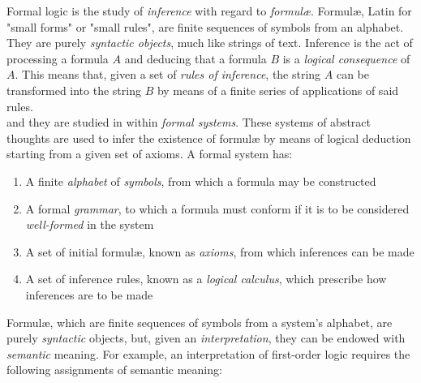 
Formal logic is the study of \textit{inference} with regard to \textit{formul{\ae}}. Formul{\ae}, Latin for "small forms" or "small rules", are finite sequences of symbols from an alphabet. They are purely \textit{syntactic objects}, much like strings of text. Inference is the act of processing a formula $A$ and deducing that a formula $B$ is a \textit{logical consequence} of $A$. This means that, given a set of \textit{rules of inference}, the string $A$ can be transformed into the string $B$ by means of a finite series of applications of said rules. \\





and they are studied in within \textit{formal systems}. These systems of abstract thoughts are used to infer the existence of formul{\ae} by means of logical deduction starting from a given set of axioms. A formal system has:

\begin{enumerate}
	\item A finite \textit{alphabet} of \textit{symbols}, from which a formula may be constructed
	\item A formal \textit{grammar}, to which a formula must conform if it is to be considered \textit{well-formed} in the system
	\item A set of initial formul{\ae}, known as \textit{axioms}, from which inferences can be made
	\item A set of inference rules, known as a \textit{logical calculus}, which prescribe how inferences are to be made
\end{enumerate}


Formul{\ae}, which are finite sequences of symbols from a system's alphabet, are purely \textit{syntactic} objects, but, given an \textit{interpretation}, they can be endowed with \textit{semantic} meaning. For example, an interpretation of first-order logic requires the following assignments of semantic meaning:

